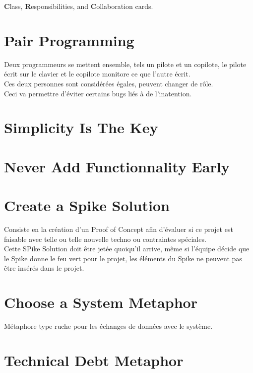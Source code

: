 \documentclass{report}
\begin{document}
		\textbf{C}lass, \textbf{R}esponsibilities, and \textbf{C}ollaboration cards.\\

	\section{Pair Programming}

		Deux programmeurs se mettent ensemble, tels un pilote et un copilote, le pilote écrit sur le clavier et le copilote monitore ce que l'autre écrit.\\

		Ces deux personnes sont considérées égales, peuvent changer de rôle.\\

		Ceci va permettre d'éviter certains bugs liés à de l'inatention.\\

	\section{Simplicity Is The Key}

	\section{Never Add Functionnality Early}


	\section{Create a Spike Solution}

		Consiste en la création d'un Proof of Concept afin d'évaluer si ce projet est faisable avec telle ou telle nouvelle techno ou contraintes spéciales.\\

		Cette SPike Solution doit être jetée quoiqu'il arrive, même si l'équipe décide que le Spike donne le feu vert pour le projet, les éléments du Spike ne peuvent pas être insérés dans le projet.\\

	\section{Choose a System Metaphor}

		Métaphore type ruche pour les échanges de données avec le système.\\

	\section{Technical Debt Metaphor}
\end{document}
